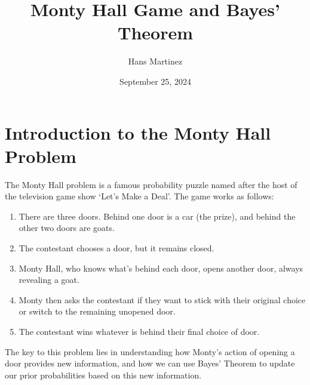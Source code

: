 \documentclass{article}
\title{Monty Hall Game and Bayes' Theorem}
\author{Hans Martinez}
\date{September 25, 2024}
\begin{document}
\maketitle

\section{Introduction to the Monty Hall Problem}

The Monty Hall problem is a famous probability puzzle named after the host of the television game show `Let's Make a Deal'. The game works as follows:

\begin{enumerate}
    \item There are three doors. Behind one door is a car (the prize), and behind the other two doors are goats.
    \item The contestant chooses a door, but it remains closed.
    \item Monty Hall, who knows what's behind each door, opens another door, always revealing a goat.
    \item Monty then asks the contestant if they want to stick with their original choice or switch to the remaining unopened door.
    \item The contestant wins whatever is behind their final choice of door.
\end{enumerate}

The key to this problem lies in understanding how Monty's action of opening a door provides new information, and how we can use Bayes' Theorem to update our prior probabilities based on this new information.

\subsection{New Information and Bayes' Theorem}

When Monty opens a door, he's not doing so randomly. He always opens a door with a goat, and he never opens the door the contestant initially chose. This action provides new information that wasn't available when the contestant made their initial choice.

Bayes' Theorem allows us to update our probabilities based on this new information. It tells us how to calculate the probability of an event A, given that we've observed event B. In the context of the Monty Hall problem:

\begin{itemize}
    \item Event A could be "the car is behind door 1"
    \item Event Z (our new information) is "Monty opened door 2, revealing a goat"
\end{itemize}
\end{document}
